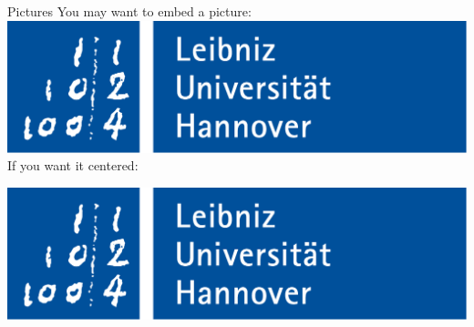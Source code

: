 \documentclass{beamer}
\begin{document}
\begin{frame}{Pictures}
	You may want to embed a picture:\\
	\includegraphics[width=\textwidth]{sra.bg/luh-logo-rgb.pdf}\\
	If you want it centered:
	\begin{realcenter}
		\includegraphics[width=\textwidth]{sra.bg/luh-logo-rgb.pdf}
	\end{realcenter}
\end{frame}
\end{document}
